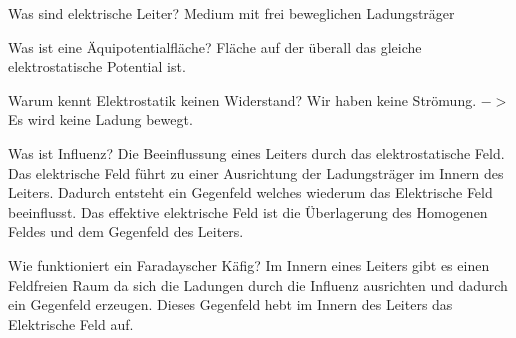 

\begin{lk}{Was sind elektrische Leiter?}
	Medium mit frei beweglichen Ladungsträger
\end{lk}	

\begin{lk}{Was ist eine Äquipotentialfläche?}
	Fläche auf der überall das gleiche elektrostatische Potential ist.
\end{lk}	

\begin{lk}{Warum kennt Elektrostatik keinen Widerstand?}
	Wir haben keine Strömung. $ -> $ Es wird keine Ladung bewegt.
\end{lk}

\begin{lk}{Was ist Influenz?}
	Die Beeinflussung eines Leiters durch das elektrostatische Feld.\\
	Das elektrische Feld führt zu einer Ausrichtung der Ladungsträger im Innern des Leiters. Dadurch entsteht ein Gegenfeld welches wiederum das Elektrische Feld beeinflusst. Das effektive elektrische Feld ist die Überlagerung des Homogenen Feldes und dem Gegenfeld des Leiters.
\end{lk}

\begin{lk}{Wie funktioniert ein Faradayscher Käfig?}
	Im Innern eines Leiters gibt es einen Feldfreien Raum da sich die Ladungen durch die Influenz ausrichten und dadurch ein Gegenfeld erzeugen. Dieses Gegenfeld hebt im Innern des Leiters das Elektrische Feld auf.
	
\end{lk}

